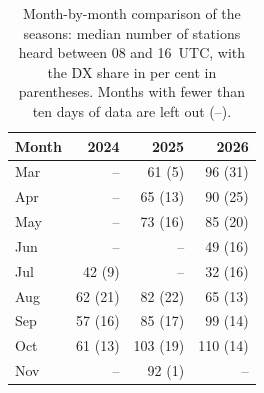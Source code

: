 \begin{table}[htbp]\centering\small
\caption{Month-by-month comparison of the seasons: median number of stations heard between 08 and 16~UTC, with the DX share in per cent in parentheses. Months with fewer than ten days of data are left out (--).}\label{tab:yoy}
\begin{tabular}{lrrr}
\toprule
Month & 2024 & 2025 & 2026 \\
\midrule
Mar & -- & 61 (5) & 96 (31) \\
Apr & -- & 65 (13) & 90 (25) \\
May & -- & 73 (16) & 85 (20) \\
Jun & -- & -- & 49 (16) \\
Jul & 42 (9) & -- & 32 (16) \\
Aug & 62 (21) & 82 (22) & 65 (13) \\
Sep & 57 (16) & 85 (17) & 99 (14) \\
Oct & 61 (13) & 103 (19) & 110 (14) \\
Nov & -- & 92 (1) & -- \\
\bottomrule
\end{tabular}
\end{table}
